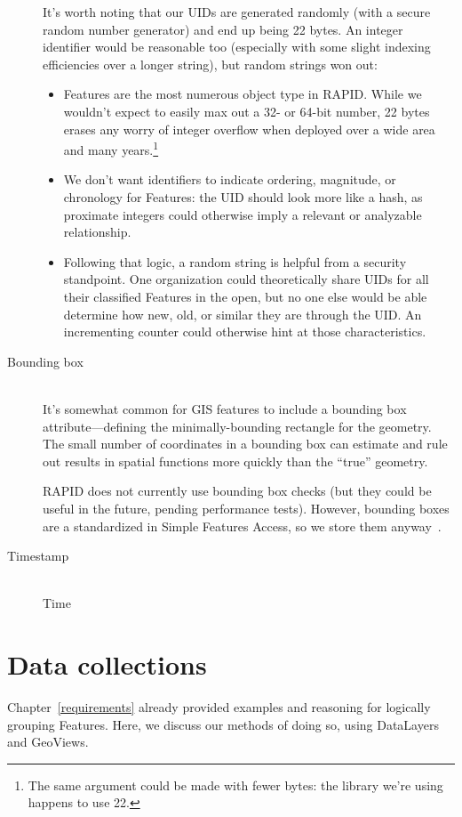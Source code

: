 \begin{description}
It's worth noting that our UIDs are generated randomly (with a secure random number generator) and end up being 22 bytes. An integer identifier would be reasonable too (especially with some slight indexing efficiencies over a longer string), but random strings won out:
  
  \begin{itemize}
  \item Features are the most numerous object type in RAPID. While we wouldn't expect to easily max out a 32- or 64-bit number, 22 bytes erases any worry of integer overflow when deployed over a wide area and many years.\footnote{The same argument could be made with fewer bytes: the library we're using happens to use 22.}
  \item We don't want identifiers to indicate ordering, magnitude, or chronology for Features: the UID should look more like a hash, as proximate integers could otherwise imply a relevant or analyzable relationship.
  \item Following that logic, a random string is helpful from a security standpoint. One organization could theoretically share UIDs for all their classified Features in the open, but no one else would be able determine how new, old, or similar they are through the UID. An incrementing counter could otherwise hint at those characteristics.
\end{itemize}
  
\item[Bounding box] \hfill \\
  It's somewhat common for GIS features to include a bounding box attribute---defining the minimally-bounding rectangle for the geometry. The small number of coordinates in a bounding box can estimate and rule out results in spatial functions more quickly than the ``true'' geometry.

  RAPID does not currently use bounding box checks (but they could be useful in the future, pending performance tests). However, bounding boxes are a standardized in Simple Features Access, so we store them anyway~\cite{SFA}.
  
\item[Timestamp] \hfill \\
Time
  
\end{description}

\section{Data collections}
Chapter~\ref{requirements} already provided examples and reasoning for logically grouping Features. Here, we discuss our methods of doing so, using DataLayers and GeoViews.

